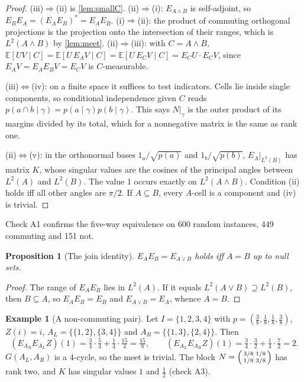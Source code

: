 \documentclass[11pt]{article}
\newtheorem{proposition}[theorem]{Proposition}
\theoremstyle{definition}
\newtheorem{example}[theorem]{Example}
\newcommand{\EE}{\mathbb E}
\begin{document}
\begin{proof}
(iii)$\Rightarrow$(ii) is \cref{lem:smallC}. (ii)$\Rightarrow$(i): $E_{A\wedge B}$ is self-adjoint, so
$E_BE_A=(E_AE_B)^*=E_AE_B$. (i)$\Rightarrow$(ii): the product of commuting orthogonal projections is the projection onto the
intersection of their ranges, which is $L^2(A\wedge B)$ by \cref{lem:meet}. (ii)$\Rightarrow$(iii): with $C=A\wedge B$,
$\EE[UV\mid C]=\EE[U\,E_AV\mid C]=\EE[U\,E_CV\mid C]=E_CU\cdot E_CV$, since $E_AV=E_AE_BV=E_CV$ is $C$-measurable.

(iii)$\Leftrightarrow$(iv): on a finite space it suffices to test indicators. Cells lie inside single components, so conditional
independence given $C$ reads $p(a\cap b\mid\gamma)=p(a\mid\gamma)p(b\mid\gamma)$. This says $N|_\gamma$ is the outer product of its
margins divided by its total, which for a nonnegative matrix is the same as rank one.

(ii)$\Leftrightarrow$(v): in the orthonormal bases $1_a/\sqrt{p(a)}$ and $1_b/\sqrt{p(b)}$, $E_A|_{L^2(B)}$ has matrix $K$, whose
singular values are the cosines of the principal angles between $L^2(A)$ and $L^2(B)$. The value $1$ occurs exactly on
$L^2(A\wedge B)$. Condition (ii) holds iff all other angles are $\pi/2$. If $A\subseteq B$, every $A$-cell is a component and (iv) is
trivial.
\end{proof}

Check A1 confirms the five-way equivalence on 600 random instances, 449 commuting and 151 not.

\begin{proposition}[The join identity]\label{prop:join}
$E_AE_B=E_{A\vee B}$ holds iff $A=B$ up to null sets.
\end{proposition}
\begin{proof}
The range of $E_AE_B$ lies in $L^2(A)$. If it equals $L^2(A\vee B)\supseteq L^2(B)$, then $B\subseteq A$, so $E_AE_B=E_B$ and
$E_{A\vee B}=E_A$, whence $A=B$.
\end{proof}

\begin{example}[A non-commuting pair]\label{ex:46}
Let $I=\{1,2,3,4\}$ with $p=(\tfrac38,\tfrac18,\tfrac18,\tfrac38)$, $Z(i)=i$, $A_L=\{\{1,2\},\{3,4\}\}$ and $A_R=\{\{1,3\},\{2,4\}\}$. Then
\[
(E_{A_R}E_{A_L}Z)(1)=\tfrac34\cdot\tfrac54+\tfrac14\cdot\tfrac{15}4=\tfrac{15}8,\qquad(E_{A_L}E_{A_R}Z)(1)=\tfrac34\cdot\tfrac32+\tfrac14\cdot\tfrac72=2 .
\]
$G(A_L,A_R)$ is a 4-cycle, so the meet is trivial. The block
$N=\begin{psmallmatrix}3/8&1/8\\1/8&3/8\end{psmallmatrix}$ has rank two, and $K$ has singular values $1$ and $\tfrac12$ (check A3).
\end{example}
\end{document}
